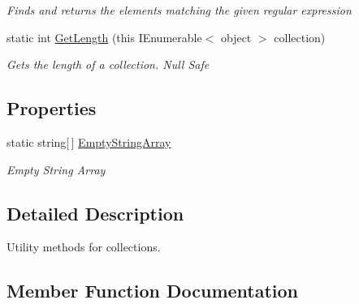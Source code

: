 \begin{DoxyCompactItemize}
\begin{DoxyCompactList}\small\item\em Finds and returns the elements matching the given regular expression \end{DoxyCompactList}\item 
static int \hyperlink{class_ultimate_1_1_utilities_1_1_collection_utils_a25da02c051c7abf093ead6cc88c49247}{Get\+Length} (this I\+Enumerable$<$ object $>$ collection)
\begin{DoxyCompactList}\small\item\em Gets the length of a collection. Null Safe \end{DoxyCompactList}\end{DoxyCompactItemize}
\subsection*{Properties}
\begin{DoxyCompactItemize}
\item 
static string\mbox{[}$\,$\mbox{]} \hyperlink{class_ultimate_1_1_utilities_1_1_collection_utils_a6470b0d730f029a73fb05e080821915c}{Empty\+String\+Array}
\begin{DoxyCompactList}\small\item\em Empty String Array \end{DoxyCompactList}\end{DoxyCompactItemize}


\subsection{Detailed Description}
Utility methods for collections. 



\subsection{Member Function Documentation}
